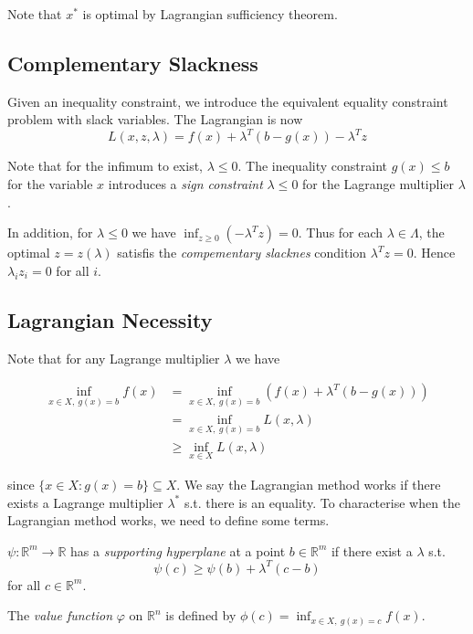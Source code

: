 \documentclass[a4paper]{article}
\begin{document}
Note that $x^*$ is optimal by Lagrangian sufficiency theorem.

\subsection{Complementary Slackness}

Given an inequality constraint, we introduce the equivalent equality constraint problem with slack variables. The Lagrangian is now
\[
  L(x, z, \lambda) = f(x) + \lambda^T (b - g(x)) - \lambda^T z
\]

Note that for the infimum to exist, $\lambda ≤ 0$. The inequality constraint $g(x) ≤ b $ for the variable $x$ introduces a \emph{sign constraint} $\lambda ≤ 0$ for the Lagrange multiplier $\lambda$.

In addition, for $\lambda ≤ 0$ we have $\displaystyle \inf_{z ≥ 0} (-\lambda^T z) = 0$. Thus for each $\lambda \in \Lambda$, the optimal $z = z(\lambda)$ satisfis the \emph{compementary slacknes} condition $\lambda^T z = 0$. Hence $\lambda_i z_i = 0$ for all $i$.

\subsection{Lagrangian Necessity}

Note that for any Lagrange multiplier $\lambda$ we have

\begin{align*}
  \inf_{x \in X,\: g(x) = b} f(x) &= \inf_{x \in X,\: g(x) = b} (f(x) + \lambda^T (b - g(x))) \\
                                &= \inf_{x \in X,\: g(x) = b} L(x, \lambda) \\
                                &≥ \inf_{x \in X} L(x, \lambda)
\end{align*}

since $\{x \in X: g(x) = b\} ⊆ X$. We say the Lagrangian method works if there exists a Lagrange multiplier $\lambda^*$ s.t. there is an equality. To characterise when the Lagrangian method works, we need to define some terms.

\begin{defi}
  $\psi: \mathbb{R}^m → \mathbb{R}$ has a \emph{supporting hyperplane} at a point $b \in \mathbb{R}^m$ if there exist a $\lambda$ s.t.
  \[
    \psi(c) ≥ \psi(b) + \lambda^T (c-b)
  \]
  for all $c \in \mathbb{R}^m$.
\end{defi}

\begin{defi}
  The \emph{value function} $φ$ on $\mathbb{R}^n$ is defined by $\displaystyle\phi(c) = \inf_{x \in X,\: g(x) = c} f(x)$.
\end{defi}
\end{document}
